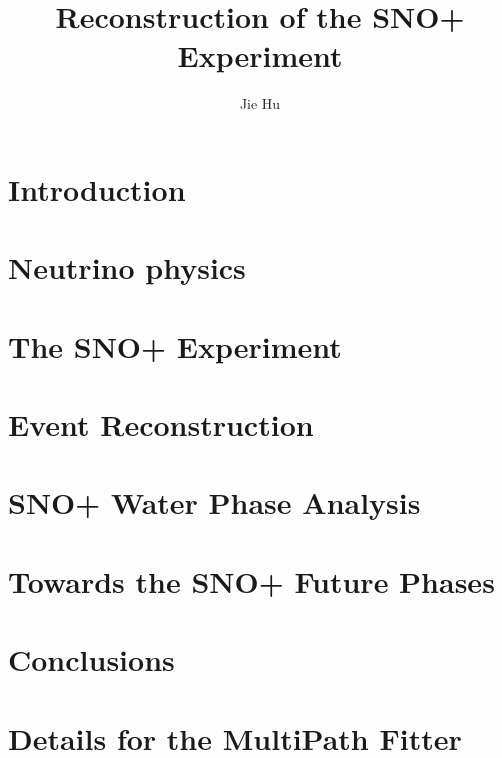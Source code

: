 \documentclass[phd,black]{PrincetonThesis}
\title{Reconstruction of the SNO+ Experiment}
\author{Jie Hu}
\begin{document}
\begin{frontmatter}
  
  \begin{thesisabstract}
    
  \end{thesisabstract}
  
  \begin{acknowledgements}
    
  \end{acknowledgements}
  
\end{frontmatter}

\cleardoublepage
\chapter{Introduction}

\chapter{Neutrino physics}

\chapter{The SNO+ Experiment}

\chapter{Event Reconstruction}

\chapter{SNO+ Water Phase Analysis}

\chapter{Towards the SNO+ Future Phases}

\chapter{Conclusions}


\appendix

\cleardoublepage
\chapter{Details for the MultiPath Fitter}

	\cleardoublepage
	\nocite{*} %
	
	
\end{document}
